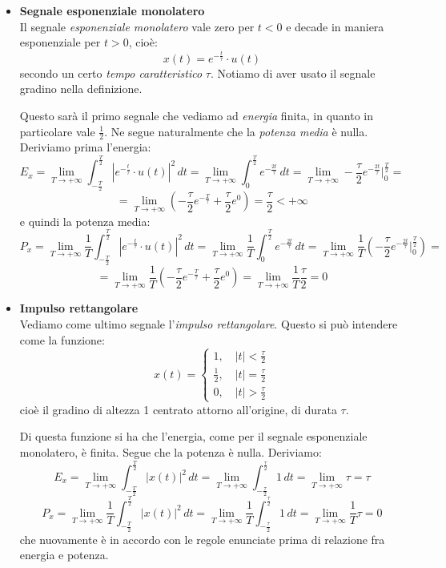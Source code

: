 \documentclass[a4paper,11pt]{article}
\begin{document}
\begin{itemize}
	\item \textbf{\textsf{Segnale esponenziale monolatero}} \\ 
Il segnale \textit{esponenziale monolatero} vale zero per $t < 0$ e decade in maniera esponenziale per $t > 0$, cioè:
$$
x(t) = e^{-\frac{t}{\tau}} \cdot u(t)
$$
secondo un certo \textit{tempo caratteristico} $\tau$. Notiamo di aver usato il segnale gradino nella definizione.

Questo sarà il primo segnale che vediamo ad \textit{energia} finita, in quanto in particolare vale $\frac{1}{2}$. Ne segue naturalmente che la \textit{potenza media} è nulla. Deriviamo prima l'energia:
$$
E_x = \lim_{T \rightarrow + \infty} \int_{-\frac{T}{2}}^{\frac{T}{2}} \left| e^{-\frac{t}{\tau}} \cdot u(t) \right|^2 \, dt = \lim_{T \rightarrow + \infty} \int_0^{\frac{T}{2}} e^{-\frac{2t}{\tau}}  \, dt = \lim_{T \rightarrow + \infty} - \frac{\tau}{2} e^{-\frac{2t}{\tau}} \Big|^{\frac{T}{2}}_0 =
$$
$$
= \lim_{T \rightarrow + \infty} \left( - \frac{\tau}{2} e^{-\frac{T}{\tau}} + \frac{\tau}{2} e^0 \right) = \frac{\tau}{2} < + \infty
$$
e quindi la potenza media:
$$
P_x = \lim_{T \rightarrow + \infty} \frac{1}{T} \int_{-\frac{T}{2}}^{\frac{T}{2}} \left| e^{-\frac{t}{\tau}} \cdot u(t) \right|^2 \, dt = \lim_{T \rightarrow + \infty} \frac{1}{T} \int_0^{\frac{T}{2}} e^{-\frac{2t}{\tau}}  \, dt = \lim_{T \rightarrow + \infty} \frac{1}{T} \left( - \frac{\tau}{2} e^{-\frac{2t}{\tau}} \Big|^{\frac{T}{2}}_0 \right) =
$$
$$
= \lim_{T \rightarrow + \infty} \frac{1}{T} \left( - \frac{\tau}{2} e^{-\frac{T}{\tau}} + \frac{\tau}{2} e^0 \right) = \lim_{T \rightarrow + \infty} \frac{1}{T} \frac{\tau}{2} = 0
$$

\item \textbf{\textsf{Impulso rettangolare}} \\
Vediamo come ultimo segnale l'\textit{impulso rettangolare}. Questo si può intendere come la funzione:
$$
x(t) = 
\begin{cases}
	1, \quad |t| < \frac{\tau}{2} \\
	\frac{1}{2}, \quad |t| = \frac{\tau}{2} \\
	0, \quad |t| > \frac{\tau}{2}
\end{cases}
$$
cioè il gradino di altezza 1 centrato attorno all'origine, di durata $\tau$.

Di questa funzione si ha che l'energia, come per il segnale esponenziale monolatero, è finita. Segue che la potenza è nulla. Deriviamo: 
$$
E_x = \lim_{T \rightarrow + \infty} \int_{-\frac{T}{2}}^{\frac{T}{2}} |x(t)|^2 \, dt = \lim_{T \rightarrow + \infty} \int_{-\frac{\tau}{2}}^{\frac{\tau}{2}} 1 \, dt = \lim_{T \rightarrow + \infty} \tau = \tau
$$
$$
P_x = \lim_{T \rightarrow + \infty} \frac{1}{T} \int_{-\frac{T}{2}}^{\frac{T}{2}} |x(t)|^2 \, dt = \lim_{T \rightarrow + \infty} \frac{1}{T} \int_{-\frac{\tau}{2}}^{\frac{\tau}{2}} 1 \, dt = \lim_{T \rightarrow + \infty} \frac{1}{T} \tau = 0
$$
che nuovamente è in accordo con le regole enunciate prima di relazione fra energia e potenza. 


\end{itemize}
\end{document}
